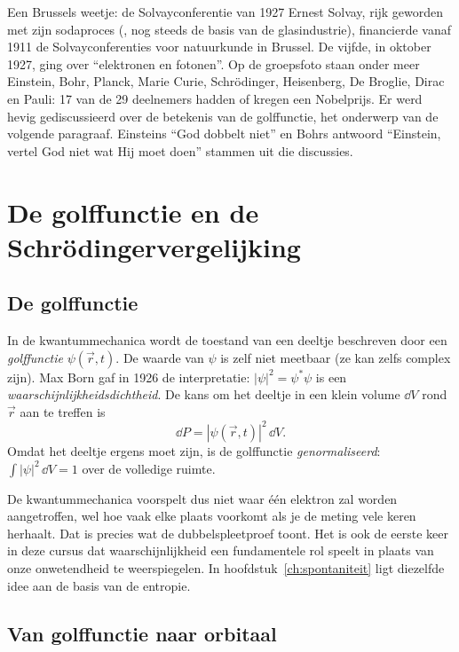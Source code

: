 \begin{toepassing}{Een Brussels weetje: de Solvayconferentie van 1927}
Ernest Solvay, rijk geworden met zijn sodaproces (, nog steeds de basis van de glasindustrie), financierde vanaf 1911 de Solvayconferenties voor natuurkunde in Brussel. De vijfde, in oktober 1927, ging over ``elektronen en fotonen''. Op de groepsfoto staan onder meer Einstein, Bohr, Planck, Marie Curie, Schr\"odinger, Heisenberg, De Broglie, Dirac en Pauli: 17 van de 29 deelnemers hadden of kregen een Nobelprijs. Er werd hevig gediscussieerd over de betekenis van de golffunctie, het onderwerp van de volgende paragraaf. Einsteins ``God dobbelt niet'' en Bohrs antwoord ``Einstein, vertel God niet wat Hij moet doen'' stammen uit die discussies.
\end{toepassing}

\section{De golffunctie en de Schr\"odingervergelijking}

\subsection{De golffunctie}
\label{sec:golffunctie}

In de kwantummechanica wordt de toestand van een deeltje beschreven door een \emph{golffunctie} $\psi(\vec r, t)$. De waarde van $\psi$ is zelf niet meetbaar (ze kan zelfs complex zijn). Max Born gaf in 1926 de interpretatie: $|\psi|^2 = \psi^*\psi$ is een \emph{waarschijnlijkheidsdichtheid}. De kans om het deeltje in een klein volume $\dd V$ rond $\vec r$ aan te treffen is
\begin{equation}
\boxed{
\dd P = |\psi(\vec{r},t)|^2\,\dd V .
}
\end{equation}
Omdat het deeltje ergens moet zijn, is de golffunctie \emph{genormaliseerd}: $\int |\psi|^2\,\dd V = 1$ over de volledige ruimte.

De kwantummechanica voorspelt dus niet waar één elektron zal worden aangetroffen, wel hoe vaak elke plaats voorkomt als je de meting vele keren herhaalt. Dat is precies wat de dubbelspleetproef toont. Het is ook de eerste keer in deze cursus dat waarschijnlijkheid een fundamentele rol speelt in plaats van onze onwetendheid te weerspiegelen. In hoofdstuk~\ref{ch:spontaniteit} ligt diezelfde idee aan de basis van de entropie.

\subsection{Van golffunctie naar orbitaal}

